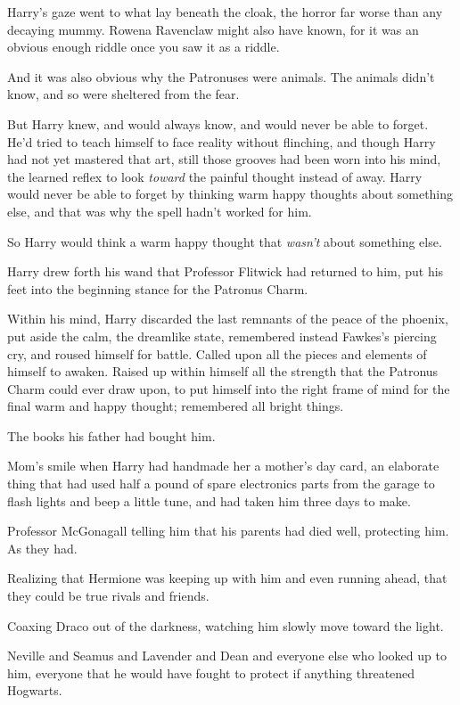Harry's gaze went to what lay beneath the cloak, the horror far worse than any decaying mummy. Rowena Ravenclaw might also have known, for it was an obvious enough riddle once you saw it as a riddle.

And it was also obvious why the Patronuses were animals. The animals didn't know, and so were sheltered from the fear.

But Harry knew, and would always know, and would never be able to forget. He'd tried to teach himself to face reality without flinching, and though Harry had not yet mastered that art, still those grooves had been worn into his mind, the learned reflex to look \emph{toward} the painful thought instead of away. Harry would never be able to forget by thinking warm happy thoughts about something else, and that was why the spell hadn't worked for him.

So Harry would think a warm happy thought that \emph{wasn't} about something else.

Harry drew forth his wand that Professor Flitwick had returned to him, put his feet into the beginning stance for the Patronus Charm.

Within his mind, Harry discarded the last remnants of the peace of the phoenix, put aside the calm, the dreamlike state, remembered instead Fawkes's piercing cry, and roused himself for battle. Called upon all the pieces and elements of himself to awaken. Raised up within himself all the strength that the Patronus Charm could ever draw upon, to put himself into the right frame of mind for the final warm and happy thought; remembered all bright things.

The books his father had bought him.

Mom's smile when Harry had handmade her a mother's day card, an elaborate thing that had used half a pound of spare electronics parts from the garage to flash lights and beep a little tune, and had taken him three days to make.

Professor McGonagall telling him that his parents had died well, protecting him. As they had.

Realizing that Hermione was keeping up with him and even running ahead, that they could be true rivals and friends.

Coaxing Draco out of the darkness, watching him slowly move toward the light.

Neville and Seamus and Lavender and Dean and everyone else who looked up to him, everyone that he would have fought to protect if anything threatened Hogwarts.

